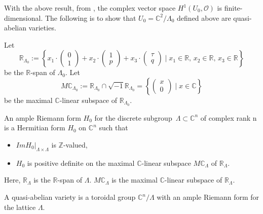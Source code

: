 \documentclass[10pt,a4paper]{amsart}
\numberwithin{equation}{section}
\def\operatorname#1{#1}
\begin{document}
With the above result, from \cite{Christian}, the complex vector space $H^1(U_0,\mathcal{O})$ is finite-dimensional. The following is to show that $U_0=\mathbb{C}^2/\Lambda_0$ defined above are quasi-abelian varieties.

Let
\[\mathbb{R}_{\Lambda_{0}}:=\left \{ x_1 \cdot \begin{pmatrix}0 \\1\end{pmatrix}+x_2 \cdot \begin{pmatrix}1 \\p\end{pmatrix} +x_3 \cdot \begin{pmatrix}\tau \\q\end{pmatrix}\mid x_1\in \mathbb{R},\,x_2\in \mathbb{R},\,x_3\in \mathbb{R}\right \}\]
be the $\mathbb{R}$-span of $\Lambda_0$. Let
\[M\mathbb{C}_{\Lambda_0}:=\mathbb{R}_{\Lambda_0}\cap\sqrt{-1}\mathbb{R}_{\Lambda_0}=\left \{ \begin{pmatrix}x \\0\end{pmatrix}\mid x\in \mathbb{C}\right \}\]
be the maximal $\mathbb{C}$-linear subspace of $\mathbb{R}_{\Lambda_{0}}$.

\begin{Definition}\label{Definition2.15}
 An ample Riemann form $H_0$ for the discrete subgroup~${\Lambda \subset \mathbb{C}^n}$ of complex rank n is a Hermitian form $H_0$ on $\mathbb{C}^n$ such that
\begin{itemize}\itemsep=0pt
\item[$(1)$]$\operatorname{ Im}H_0|_{\Lambda\times\Lambda}$ is $\mathbb{Z}$-valued,
\item[$(2)$]$H_0$ is positive definite on the maximal $\mathbb{C}$-linear subspace $M\mathbb{C}_\Lambda$ of $\mathbb{R}_\Lambda$.
\end{itemize}
Here, $\mathbb{R}_\Lambda$ is the $\mathbb{R}$-span of $\Lambda$. $M\mathbb{C}_\Lambda$ is the maximal $\mathbb{C}$-linear subspace of $\mathbb{R}_\Lambda$.
\end{Definition}

\begin{Definition}\label{Definition2.16}
 A quasi-abelian variety is a toroidal group $\mathbb{C}^n/\Lambda$ with an ample Riemann form for the lattice $\Lambda$.
\end{Definition}
\end{document}
